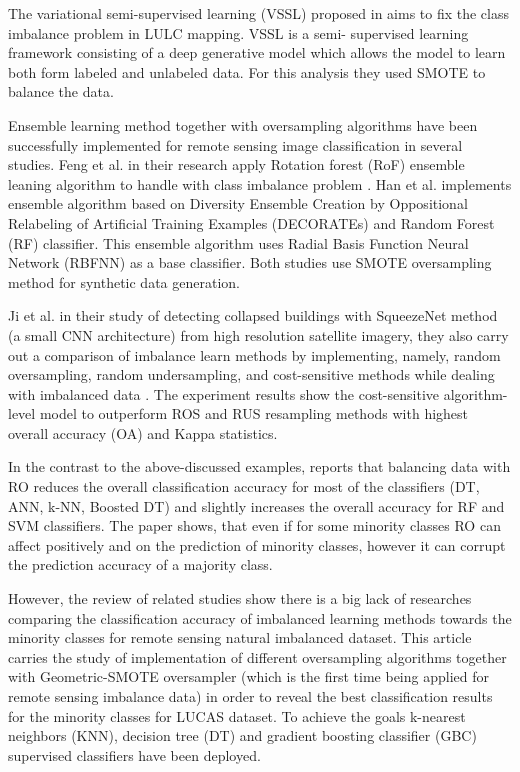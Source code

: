 \documentclass[parskip=full]{scrartcl}
\begin{document}
The variational semi-supervised learning (VSSL) proposed in \cite{Cenggoro2018}
aims to fix the class imbalance problem in LULC mapping. VSSL is a semi-
supervised learning framework consisting of a deep generative model which
allows the model to learn both form labeled and unlabeled data. For this
analysis they used SMOTE to balance the data.

Ensemble learning method together with oversampling algorithms have been
successfully implemented for remote sensing image classification in several
studies. Feng et al. in their research apply Rotation forest (RoF) ensemble
leaning algorithm to handle with class imbalance problem \cite{Feng2019}. Han
et al. \cite{Han2012} implements ensemble algorithm based on Diversity Ensemble
Creation by Oppositional Relabeling of Artificial Training Examples (DECORATEs)
and Random Forest (RF) classifier. This ensemble algorithm uses Radial Basis
Function Neural Network (RBFNN) as a base classifier. Both studies use SMOTE
oversampling method for synthetic data generation.

Ji et al. in their study of detecting collapsed buildings with SqueezeNet method
(a small CNN architecture) from high resolution satellite imagery, they also
carry out a comparison of imbalance learn methods by implementing, namely,
random oversampling, random undersampling, and cost-sensitive methods while
dealing with imbalanced data \cite{Ji2018}. The experiment results show the
cost-sensitive algorithm-level model to outperform ROS and RUS resampling
methods with highest overall accuracy (OA) and Kappa statistics.

In the contrast to the above-discussed examples, \cite{Maxwell2018} reports
that balancing data with RO reduces the overall classification accuracy for
most of the classifiers (DT, ANN, k-NN, Boosted DT) and slightly increases the
overall accuracy for RF and SVM classifiers. The paper shows, that even if for
some minority classes RO can affect positively and on the prediction of
minority classes, however it can corrupt the prediction accuracy of a majority
class.

However, the review of related studies show there is a big lack of researches
comparing the classification accuracy of imbalanced learning methods towards the
minority classes for remote sensing natural imbalanced dataset. This article
carries the study of implementation of different oversampling algorithms
together with Geometric-SMOTE oversampler (which is the first time being applied
for remote sensing imbalance data) in order to reveal the best classification
results for the minority classes for LUCAS dataset. To achieve the goals
k-nearest neighbors (KNN), decision tree (DT) and gradient boosting classifier
(GBC) supervised classifiers have been deployed.
\end{document}
